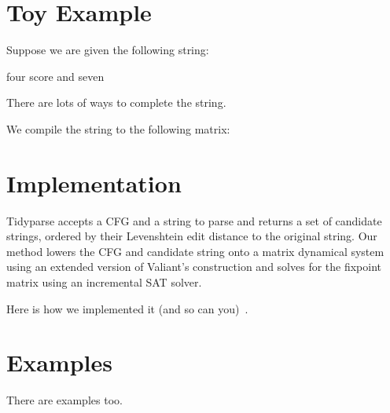 \documentclass[sigplan,nonacm]{acmart}\settopmatter{printfolios=false,printccs=false,printacmref=false}
\begin{document}
\section{Toy Example}

Suppose we are given the following string:

\begin{kotlinlisting}
   four score and seven
\end{kotlinlisting}

There are lots of ways to complete the string.

We compile the string to the following matrix:

\section{Implementation}

Tidyparse accepts a CFG and a string to parse and returns a set of candidate strings, ordered by their Levenshtein edit distance to the original string. Our method lowers the CFG and candidate string onto a matrix dynamical system using an extended version of Valiant's construction and solves for the fixpoint matrix using an incremental SAT solver.

    Here is how we implemented it (and so can you)~\cite{valiant1975general}.
\section{Examples}
    There are examples too.

\end{document}
